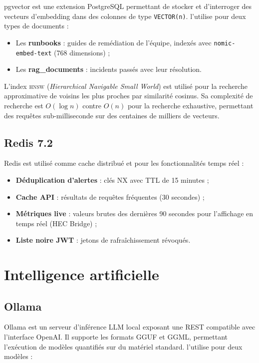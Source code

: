 pgvector \cite{pgvector2021} est une extension PostgreSQL permettant de stocker
et d'interroger des vecteurs d'embedding dans des colonnes de type \texttt{VECTOR(n)}.
\caimp{} l'utilise pour deux types de documents :

\begin{itemize}
  \item Les \textbf{runbooks} : guides de remédiation de l'équipe, indexés avec
    \texttt{nomic-embed-text} (768 dimensions) ;
  \item Les \textbf{rag\_documents} : incidents passés avec leur résolution.
\end{itemize}

L'index \textsc{hnsw} (\textit{Hierarchical Navigable Small World}) est utilisé
pour la recherche approximative de voisins les plus proches par similarité
cosinus. Sa complexité de recherche est $O(\log n)$ contre $O(n)$ pour la
recherche exhaustive, permettant des requêtes sub-milliseconde sur des centaines
de milliers de vecteurs.

\subsection{Redis 7.2}

Redis est utilisé comme cache distribué et pour les fonctionnalités temps réel :

\begin{itemize}
  \item \textbf{Déduplication d'alertes} : clés NX avec TTL de 15 minutes ;
  \item \textbf{Cache API} : résultats de requêtes fréquentes (30 secondes) ;
  \item \textbf{Métriques live} : valeurs brutes des dernières 90 secondes
    pour l'affichage en temps réel (HEC Bridge) ;
  \item \textbf{Liste noire JWT} : jetons de rafraîchissement révoqués.
\end{itemize}

\section{Intelligence artificielle}

\subsection{Ollama}

Ollama est un serveur d'inférence LLM local exposant une \api{} REST compatible
avec l'interface OpenAI. Il supporte les formats GGUF et GGML, permettant
l'exécution de modèles quantifiés sur du matériel standard. \caimp{} l'utilise
pour deux modèles :

